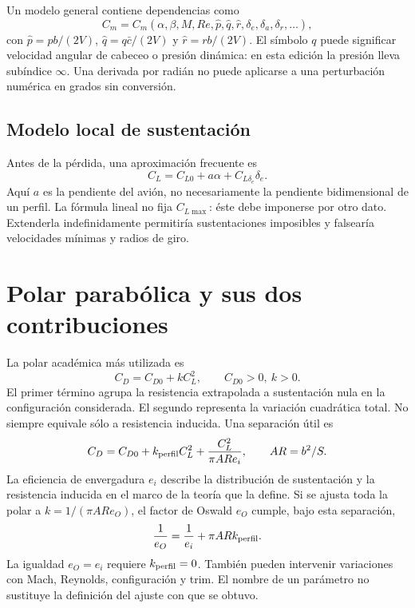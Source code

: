 Un modelo general contiene dependencias como
\begin{equation}
C_m=C_m(\alpha,\beta,M,Re,\widehat p,\widehat q,\widehat r,\delta_e,\delta_a,\delta_r,\ldots),
\end{equation}
con $\widehat p=pb/(2V)$, $\widehat q=q\bar c/(2V)$ y $\widehat r=rb/(2V)$. El símbolo $q$ puede significar velocidad angular de cabeceo o presión dinámica: en esta edición la presión lleva subíndice $\infty$. Una derivada por radián no puede aplicarse a una perturbación numérica en grados sin conversión.

\subsection{Modelo local de sustentación}
Antes de la pérdida, una aproximación frecuente es
\begin{equation}
C_L=C_{L0}+a\alpha+C_{L\delta_e}\delta_e.
\end{equation}
Aquí $a$ es la pendiente del avión, no necesariamente la pendiente bidimensional de un perfil. La fórmula lineal no fija $C_{L\max}$: éste debe imponerse por otro dato. Extenderla indefinidamente permitiría sustentaciones imposibles y falsearía velocidades mínimas y radios de giro.

\section{Polar parabólica y sus dos contribuciones}
La polar académica más utilizada es
\begin{equation}
C_D=C_{D0}+kC_L^2,\qquad C_{D0}>0,\ k>0.\label{eq:polar}
\end{equation}
El primer término agrupa la resistencia extrapolada a sustentación nula en la configuración considerada. El segundo representa la variación cuadrática total. No siempre equivale sólo a resistencia inducida. Una separación útil es
\begin{equation}
C_D=C_{D0}+k_{\rm perfil}C_L^2+
\frac{C_L^2}{\pi AR e_i},\qquad AR=b^2/S.
\end{equation}
La eficiencia de envergadura $e_i$ describe la distribución de sustentación y la resistencia inducida en el marco de la teoría que la define. Si se ajusta toda la polar a $k=1/(\pi AR e_O)$, el factor de Oswald $e_O$ cumple, bajo esta separación,
\begin{equation}
\frac1{e_O}=\frac1{e_i}+\pi ARk_{\rm perfil}.
\label{eq:oswald}
\end{equation}
La igualdad $e_O=e_i$ requiere $k_{\rm perfil}=0$. También pueden intervenir variaciones con Mach, Reynolds, configuración y trim. El nombre de un parámetro no sustituye la definición del ajuste con que se obtuvo.

